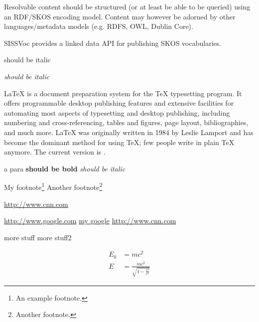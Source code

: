 \documentclass[10pt,a4paper]{article}
\begin{document}
\begin{flushleft}
\begin{subsection}{Resolvable content should be structured (or at least be able to be queried)
  using an RDF/SKOS encoding model. Content may however be adorned by other
  languages/metadata models (e.g. RDFS, OWL, Dublin Core).  }

  SISSVoc provides a linked data API for publishing SKOS vocabularies.


  \begin{textit}{
    should be italic
  }
  \end{textit}


\end{subsection}





  \end{flushleft}


  \textit{should be italic}


\LaTeX{} is a document preparation system for the \TeX{}
  typesetting program. It offers programmable desktop
  publishing features and extensive facilities for
  automating most aspects of typesetting and desktop
  publishing, including numbering and cross-referencing,
  tables and figures, page layout, bibliographies, and
  much more. \LaTeX{} was originally written in 1984 by
  Leslie Lamport and has become the dominant method for
  using \TeX; few people write in plain \TeX{} anymore.
  The current version is \LaTeXe.

  \begin{flushright}
  a para
  \textbf{should be bold}
  \textit{should be italic}

  \end{flushright}



  \begin{flushleft}
  My footnote\footnote{An example footnote.}
  Another footnote\footnote{Another footnote.}

  \hyperref[cnn]{http://www.cnn.com}

  \url{http://www.google.com}
  \href{http://www.google.com}{my google}
  \href{http://www.cnn.com}{http://www.cnn.com}

  \end{flushleft}
  more stuff
  more stuff2

  \begin{align}
    E_0 &= mc^2                              \\
    E &= \frac{mc^2}{\sqrt{1-\frac{v^2}{c^2}}}
  \end{align}
\end{document}
